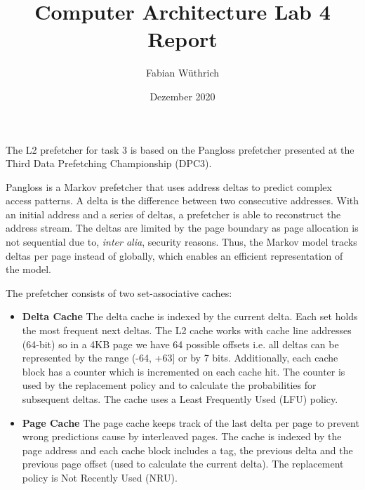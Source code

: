 \documentclass[a4paper]{article}
\begin{document}
\title{Computer Architecture Lab 4 Report}
\author{Fabian Wüthrich}
\date{Dezember 2020}
\maketitle

The L2 prefetcher for task 3 is based on the Pangloss prefetcher\cite{pangloss}
presented at the Third Data Prefetching Championship (DPC3)\cite{dpc3}.

Pangloss is a Markov prefetcher\cite{markov-prefetcher} that uses address deltas
to predict complex access patterns. A delta is the difference between two
consecutive addresses. With an initial address and a series of deltas,
a prefetcher is able to reconstruct the address stream. The deltas are limited
by the page boundary as page allocation is not sequential due to, \textit{inter
alia}, security reasons. Thus, the Markov model tracks deltas per page instead
of globally, which enables an efficient representation of the model.

The prefetcher consists of two set-associative caches:
\begin{itemize}
    \item \textbf{Delta Cache} The delta cache is indexed by the current delta.
        Each set holds the most frequent next deltas. The L2 cache works with
        cache line addresses (64-bit) so in a 4KB page we have 64 possible
        offsets i.e. all deltas can be represented by the range (-64, +63] or by
        7 bits.  Additionally, each cache block has a counter which is
          incremented on each cache hit. The counter is used by the replacement
          policy and to calculate the probabilities for subsequent deltas. The
          cache uses a Least Frequently Used (LFU) policy.

    \item \textbf{Page Cache} The page cache keeps track of the last delta per
        page to prevent wrong predictions cause by interleaved pages. The cache
        is indexed by the page address and each cache block includes a tag, the
        previous delta and the previous page offset (used to calculate the
        current delta). The replacement policy is Not Recently Used (NRU).
\end{itemize}
\end{document}
